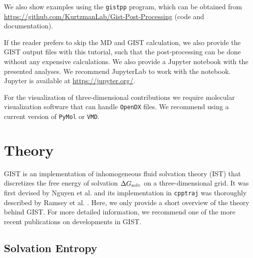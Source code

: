 \documentclass[9pt,tutorial]{livecoms}
\newcommand{\dgsolv}{\Delta G_\textup{solv}}
\newcommand{\software}{\texttt}
\begin{document}
We also show examples using the \software{gistpp} program, which can be obtained from \url{https://github.com/KurtzmanLab/Gist-Post-Processing} (code and documentation).

If the reader prefers to skip the MD and GIST calculation, we also provide the GIST output files with this tutorial, such that the post-processing can be done without any expensive calculations.
We also provide a Jupyter notebook \cite{Kluyver2016-jupyter,Granger2021-jupyter} with the presented analyses. 
We recommend JupyterLab to work with the notebook. Jupyter is available at \url{https://jupyter.org/}.

For the visualization of three-dimensional contributions we require molecular visualization software that can handle \software{OpenDX} files.
We recommend using a current version of \software{PyMol}\cite{pymol} or \software{VMD}\cite{vmd}.
\section{Theory}

GIST is an implementation of inhomogeneous fluid solvation theory (IST) \cite{Lazaridis1998} that discretizes the free energy of solvation $\dgsolv$ on a three-dimensional grid. 
It was first devised by Nguyen et al. \cite{Nguyen2012} and its implementation in \software{cpptraj} was thoroughly described by Ramsey et al. \cite{Ramsey2016}. %
Here, we only provide a short overview of the theory behind GIST.
For more detailed information, we recommend one of the more recent publications on developments in GIST. \cite{Kraml2020,Chen2021}

\subsection{Solvation Entropy}

\end{document}

